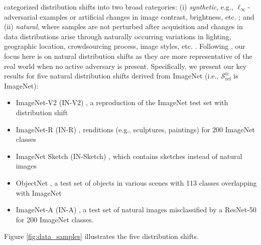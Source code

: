 \citet{taori2020measuring} categorized distribution shifts into two broad categories:
(i) \emph{synthetic}, e.g., $\ell_\infty$-adversarial examples or artificial changes in image contrast, brightness, etc. \cite{imagenetc,biggio2013evasion,biggio2018wild,geirhos2018generalisation,alcorn2019strike}; and 
(ii) \emph{natural}, where samples are not perturbed after acquisition and changes in data distributions arise through naturally occurring variations in lighting, geographic location, crowdsourcing process, image styles, etc. \cite{taori2020measuring, pmlr-v97-recht19a, imagenetr, imageneta, wilds2021}.
Following \citet{radford2019language}, our focus here is on natural distribution shifts as they are more representative of the real world when no active adversary is present. 
Specifically, we present our key results for five natural distribution shifts derived from ImageNet (i.e., $\mathcal{S}^\text{tr}_\text{ref}$ is ImageNet):
\begin{itemize}
 \item
ImageNet-V2 (IN-V2) \cite{pmlr-v97-recht19a}, a reproduction of the ImageNet test set with distribution shift
\item ImageNet-R (IN-R) \cite{imagenetr}, renditions (e.g., sculptures, paintings) for 200 ImageNet classes
\item ImageNet Sketch (IN-Sketch) \cite{imagenetsketch}, which contains sketches instead of natural images
\item ObjectNet \cite{objectnet}, a test set of objects in various scenes with 113 classes overlapping with ImageNet
\item ImageNet-A (IN-A) \cite{imageneta}, a test set of natural images misclassified by a ResNet-50 \cite{he2016deep} for 200 ImageNet classes.
\end{itemize}
Figure \ref{fig:data_samples} illustrates the five distribution shifts.

